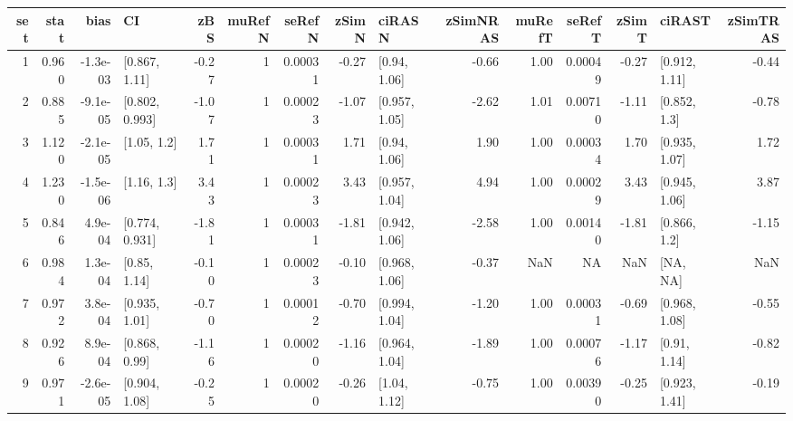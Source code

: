 
\begin{tabular}{r|r|r|l|r|r|r|r|l|r|r|r|r|l|r}
\hline
set & stat & bias & CI & zBS & muRefN & seRefN & zSimN & ciRASN & zSimNRAS & muRefT & seRefT & zSimT & ciRAST & zSimTRAS\\
\hline
1 & 0.960 & -1.3e-03 & [0.867, 1.11] & -0.27 & 1 & 0.00031 & -0.27 & [0.94, 1.06] & -0.66 & 1.00 & 0.00049 & -0.27 & [0.912, 1.11] & -0.44\\
\hline
2 & 0.885 & -9.1e-05 & [0.802, 0.993] & -1.07 & 1 & 0.00023 & -1.07 & [0.957, 1.05] & -2.62 & 1.01 & 0.00710 & -1.11 & [0.852, 1.3] & -0.78\\
\hline
3 & 1.120 & -2.1e-05 & [1.05, 1.2] & 1.71 & 1 & 0.00031 & 1.71 & [0.94, 1.06] & 1.90 & 1.00 & 0.00034 & 1.70 & [0.935, 1.07] & 1.72\\
\hline
4 & 1.230 & -1.5e-06 & [1.16, 1.3] & 3.43 & 1 & 0.00023 & 3.43 & [0.957, 1.04] & 4.94 & 1.00 & 0.00029 & 3.43 & [0.945, 1.06] & 3.87\\
\hline
5 & 0.846 & 4.9e-04 & [0.774, 0.931] & -1.81 & 1 & 0.00031 & -1.81 & [0.942, 1.06] & -2.58 & 1.00 & 0.00140 & -1.81 & [0.866, 1.2] & -1.15\\
\hline
6 & 0.984 & 1.3e-04 & [0.85, 1.14] & -0.10 & 1 & 0.00023 & -0.10 & [0.968, 1.06] & -0.37 & NaN & NA & NaN & [NA, NA] & NaN\\
\hline
7 & 0.972 & 3.8e-04 & [0.935, 1.01] & -0.70 & 1 & 0.00012 & -0.70 & [0.994, 1.04] & -1.20 & 1.00 & 0.00031 & -0.69 & [0.968, 1.08] & -0.55\\
\hline
8 & 0.926 & 8.9e-04 & [0.868, 0.99] & -1.16 & 1 & 0.00020 & -1.16 & [0.964, 1.04] & -1.89 & 1.00 & 0.00076 & -1.17 & [0.91, 1.14] & -0.82\\
\hline
9 & 0.971 & -2.6e-05 & [0.904, 1.08] & -0.25 & 1 & 0.00020 & -0.26 & [1.04, 1.12] & -0.75 & 1.00 & 0.00390 & -0.25 & [0.923, 1.41] & -0.19\\
\hline
\end{tabular}
